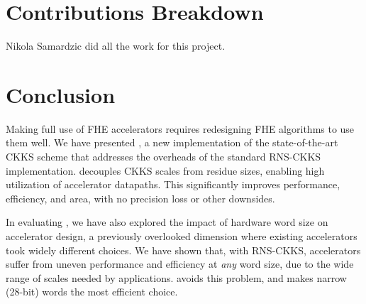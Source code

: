 \section{Contributions Breakdown}

Nikola Samardzic did all the work for this project.

\section{Conclusion}\label{sec:conclusion}

Making full use of FHE accelerators requires redesigning FHE algorithms to use them well.
We have presented \name, a new implementation of the state-of-the-art CKKS scheme that addresses
the overheads of the standard RNS-CKKS implementation.
\name decouples CKKS scales from residue sizes, enabling high utilization of accelerator datapaths.
This significantly improves performance, efficiency, and area, with no precision loss or other downsides.

In evaluating \name, we have also explored the impact of hardware word size on accelerator design,
a previously overlooked dimension where existing accelerators took widely different choices.
We have shown that, with RNS-CKKS, accelerators suffer from uneven performance and efficiency at \emph{any} word size,
due to the wide range of scales needed by applications. \name avoids this problem,
and makes narrow (28-bit) words the most efficient choice.

